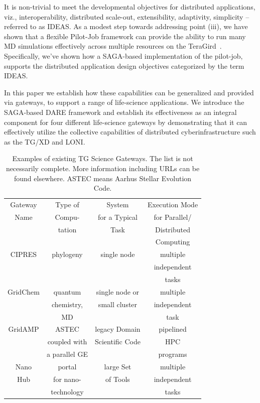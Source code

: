 \documentclass{sig-alternate}
\begin{document}
It is non-trivial to meet the developmental objectives for distributed
applications, viz., interoperability, distributed scale-out,
extensibility, adaptivity, simplicity -- referred to as
IDEAS\cite{ideas}.  As a modest step towards addressing point (iii),
we have shown that a flexible Pilot-Job framework can provide the
ability to run many MD simulations effectively across multiple
resources on the TeraGird~\cite{saga-royalsoc, saga-ccgrid10}.
Specifically, we've shown how a SAGA-based implementation of the
pilot-job, supports the distributed application design objectives
categorized by the term IDEAS\cite{ideas}.

In this paper we establish how these capabilities can be generalized
and provided via gateways, to support a range of life-science
applications.  We introduce the SAGA-based DARE framework and
establish its effectiveness as an integral component for four
different life-science gateways by demonstrating that it can
effectively utilize the collective capabilities of distributed
cyberinfrastructure such as the TG/XD and LONI.

\begin{table}
 \small
\begin{tabular}{|c|c|c|c|} 
  \hline Gateway  & Type of & System  & Execution Mode 
  \\
  Name & Compu- & for a Typical & for Parallel/ \\ 
  &  tation & Task & Distributed \\
  & & & Computing \\  \hline \hline 
  
  CIPRES   & phylogeny  &  single node  & multiple  \\
   &  &   & independent   \\ 
  &  &  &  tasks \\  \hline
  GridChem   & quantum & single node or     & multiple  \\
     & chemistry, & small cluster & independent   \\
  & MD &  & task  \\ \hline
   GridAMP     & ASTEC  & legacy Domain  & pipelined \\ 
  & coupled with  &  Scientific Code   & HPC  \\
  & a parallel GE &   &  programs \\ \hline
  Nano  & portal  & large Set   & multiple \\
  Hub  & for nano- & of Tools  & independent \\
   & technology &  & tasks \\ \hline
  \hline
\end{tabular} \caption{Examples of existing TG Science Gateways. The list is not necessarily complete. More information including URLs can be found elsewhere\cite{tg-sg-list-url}.  ASTEC means Aarhus Stellar Evolution Code.}
 \label{table:TG-sg} 
\end{table}
\end{document}
